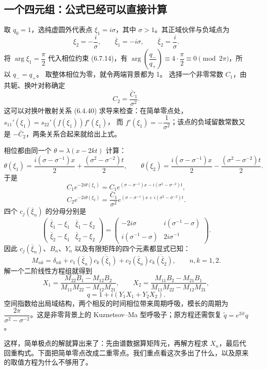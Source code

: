 \documentclass[lang=cn,scheme=chinese,mode=simple,device=normal,color=blue,math=cm,thmcnt=section,12pt]{elegantbook}
\begin{document}
\subsection*{一个四元组：公式已经可以直接计算}
取 $q_0=1$，选纯虚圆外代表点 $\xi_1=i\sigma$，其中 $\sigma>1$。其正域伙伴与负域点为
\[
\xi_2=-\dfrac{i}{\sigma},\qquad
\bar\xi_1=-i\sigma,\qquad \bar\xi_2=\dfrac{i}{\sigma}.
\]
将 $\arg\xi_1=\dfrac{\pi}{2}$ 代入相位约束 (6.7.14)，有
$\arg\left(\dfrac{q_-}{q_+}\right)\equiv4\cdot\dfrac{\pi}{2}\equiv0\pmod{2\pi}$，所以 $q_-=q_+$。
取整体相位为零，就令两端背景都为 1。
选择一个非零常数 $C_1$，由共轭、换叶对称确定
\[
C_2=\dfrac{\bar C_1}{\sigma^2}.
\]
这可以对换叶散射关系 (6.4.40) 求导来检查：在简单零点处，
$s_{11}'(\xi_1)=s_{22}'(f(\xi_1))f'(\xi_1)$，
而 $f'(\xi_1)=-\dfrac{1}{\sigma^2}$；该点的负域留数常数又是 $-\bar C_2$，两条关系合起来就给出上式。

相位都由同一个 $\theta=\lambda(x-2kt)$ 计算：
\[
\theta(\xi_1)=\dfrac{i(\sigma-\sigma^{-1})x}{2}
+\dfrac{(\sigma^2-\sigma^{-2})t}{2},\qquad
\theta(\xi_2)=\dfrac{i(\sigma-\sigma^{-1})x}{2}
-\dfrac{(\sigma^2-\sigma^{-2})t}{2}.
\]
于是
\[
C_1e^{-2i\theta(\xi_1)}
=C_1e^{(\sigma-\sigma^{-1})x-i(\sigma^2-\sigma^{-2})t},
\]
\[
C_2e^{-2i\theta(\xi_2)}
=\dfrac{\bar C_1}{\sigma^2}
e^{(\sigma-\sigma^{-1})x+i(\sigma^2-\sigma^{-2})t}.
\]
四个 $c_j(\bar\xi_n)$ 的分母分别是
\[
\begin{pmatrix}
\bar\xi_1-\xi_1&\bar\xi_1-\xi_2\\
\bar\xi_2-\xi_1&\bar\xi_2-\xi_2
\end{pmatrix}
=\begin{pmatrix}
-2i\sigma&i(\sigma^{-1}-\sigma)\\
i(\sigma^{-1}-\sigma)&2i\sigma^{-1}
\end{pmatrix}.
\]
因此 $c_j(\bar\xi_n)$、$B_n$、$Y_n$ 以及有限矩阵的四个元素都显式已知：
\[
M_{nk}=\delta_{nk}
+c_1(\bar\xi_n)\overline{c_k(\bar\xi_1)}
+c_2(\bar\xi_n)\overline{c_k(\bar\xi_2)},\qquad n,k=1,2.
\]
解一个二阶线性方程组就得到
\[
X_1=\dfrac{M_{22}B_1-M_{12}B_2}{M_{11}M_{22}-M_{12}M_{21}},
\qquad
X_2=\dfrac{M_{11}B_2-M_{21}B_1}{M_{11}M_{22}-M_{12}M_{21}},
\]
\[
q=1+i(Y_1X_1+Y_2X_2).
\]
空间指数给出局域结构，两个相反的时间相位带来周期呼吸，模长的周期为 $\dfrac{2\pi}{\sigma^2-\sigma^{-2}}$。这是非零背景上的 Kuznetsov--Ma 型呼吸子；原方程还需恢复 $\widetilde q=e^{2it}q$。

这样，简单极点的解就算出来了：先由谱数据算矩阵元，再解方程求 $X_n$，最后代回重构式。下面把简单零点改成二重零点。我们重点看这次多出了什么，以及原来的取值方程为什么不够用了。
\end{document}

